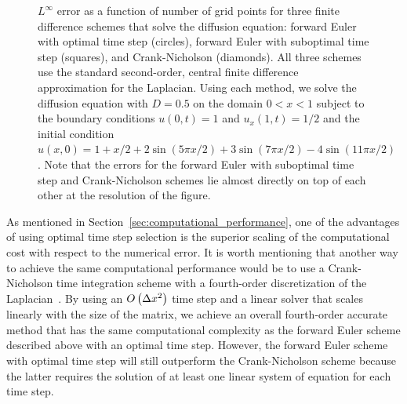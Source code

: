 \documentclass[oneeqnum,onefignum,onetabnum,onethmnum]{siamltex}
\begin{document}
\begin{figure}[htb]
\begin{center}
\caption{$L^\infty$ error as a function of number of grid points for three 
finite difference schemes that solve the diffusion equation: forward Euler 
with optimal time step (circles), forward Euler with suboptimal time step 
(squares), and Crank-Nicholson (diamonds).  All three schemes use the 
standard second-order, central finite difference approximation for the 
Laplacian.  Using each method, we solve the diffusion equation with $D = 0.5$ 
on the domain $0 < x < 1$ subject to the boundary conditions 
$u(0,t) = 1$ and $u_x(1,t) = 1/2$ 
and the initial condition
$u(x,0) = 1 + x/2 + 2 \sin(5 \pi x/2) + 3 \sin(7 \pi x/2) 
- 4 \sin(11 \pi x/2)$.  
Note that the errors for the forward Euler with suboptimal time 
step and Crank-Nicholson schemes lie almost directly on top of each other
at the resolution of the figure.
}
\label{fig:diffusion_eqn_1d_no_src_error}
\end{center}
\end{figure}

As mentioned in Section~\ref{sec:computational_performance}, one of the 
advantages of using optimal time step selection is the superior scaling of 
the computational cost with respect to the numerical error.  It is worth 
mentioning that another way to achieve the same computational performance
would be to use a Crank-Nicholson time integration scheme with a fourth-order 
discretization of the Laplacian~\cite{gibou_2005}.  By using an 
$O\left(\Delta x^2 \right)$ time step and a linear solver that scales linearly 
with the size of the matrix, we achieve an overall fourth-order accurate 
method that has the same computational complexity as the forward Euler scheme
described above with an optimal time step.  However, the forward Euler scheme 
with optimal time step will still outperform the Crank-Nicholson scheme 
because the latter requires the solution of at least one linear system of
equation for each time step. 
\end{document}
